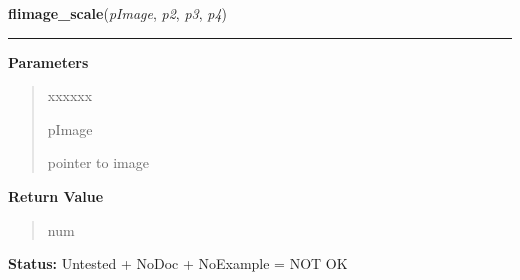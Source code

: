 \hspace{.8\funcindent}\begin{boxedminipage}{\funcwidth}

    \raggedright \textbf{flimage\_scale}(\textit{pImage}, \textit{p2}, \textit{p3}, \textit{p4})

    \vspace{-1.5ex}

    \rule{\textwidth}{0.5\fboxrule}
\setlength{\parskip}{2ex}
\setlength{\parskip}{1ex}
      \textbf{Parameters}
      \vspace{-1ex}

      \begin{quote}
        \begin{Ventry}{xxxxxx}

          \item[pImage]

          pointer to image

        \end{Ventry}

      \end{quote}

      \textbf{Return Value}
    \vspace{-1ex}

      \begin{quote}
      num

      \end{quote}

\textbf{Status:} Untested + NoDoc + NoExample = NOT OK



    \end{boxedminipage}

    \label{xformslib:library:flimage_warp}

    \vspace{0.5ex}

